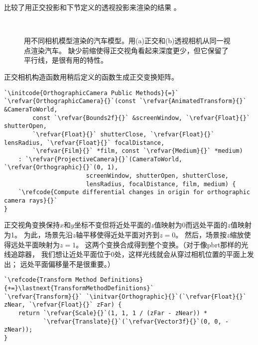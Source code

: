比较了用正交投影和下节定义的透视投影来渲染的结果
。
\begin{figure}[htbp]
    \centering
    \\
    \caption{用不同相机模型渲染的汽车模型。用(a)正交和(b)透视相机从同一视点渲染汽车。
        缺少前缩使得正交视角看起来深度更少，但它保留了平行线，是很有用的特性。}
    \label{fig:6.3}
\end{figure}

正交相机构造函数用稍后定义的函数生成正交变换矩阵。
\begin{lstlisting}
`\initcode{OrthographicCamera Public Methods}{=}`
`\refvar{OrthographicCamera}{}`(const `\refvar{AnimatedTransform}{}` &CameraToWorld,
        const `\refvar{Bounds2f}{}` &screenWindow, `\refvar{Float}{}` shutterOpen,
        `\refvar{Float}{}` shutterClose, `\refvar{Float}{}` lensRadius, `\refvar{Float}{}` focalDistance,
        `\refvar{Film}{}` *film, const `\refvar{Medium}{}` *medium)
    : `\refvar{ProjectiveCamera}{}`(CameraToWorld, `\refvar{Orthographic}{}`(0, 1),
                       screenWindow, shutterOpen, shutterClose,
                       lensRadius, focalDistance, film, medium) {
    `\refcode{Compute differential changes in origin for orthographic camera rays}{}`
}
\end{lstlisting}

正交视角变换保持$x$和$y$坐标不变但将近处平面的$z$值映射为0而远处平面的$z$值映射为1。
为此，场景先沿$z$轴平移使得近处平面对齐到$z=0$。
然后，场景按$z$缩放使得远处平面映射为$z=1$。
这两个变换合成得到整个变换。（对于像pbrt那样的光线追踪器，
我们想让近处平面位于0处，这样光线就会从穿过相机位置的平面上发出；
远处平面偏移量不是很重要。）
\begin{lstlisting}
`\refcode{Transform Method Definitions}{+=}\lastnext{TransformMethodDefinitions}`
`\refvar{Transform}{}` `\initvar{Orthographic}{}`(`\refvar{Float}{}` zNear, `\refvar{Float}{}` zFar) {
    return `\refvar{Scale}{}`(1, 1, 1 / (zFar - zNear)) *
           `\refvar{Translate}{}`(`\refvar{Vector3f}{}`(0, 0, -zNear));
}
\end{lstlisting}


